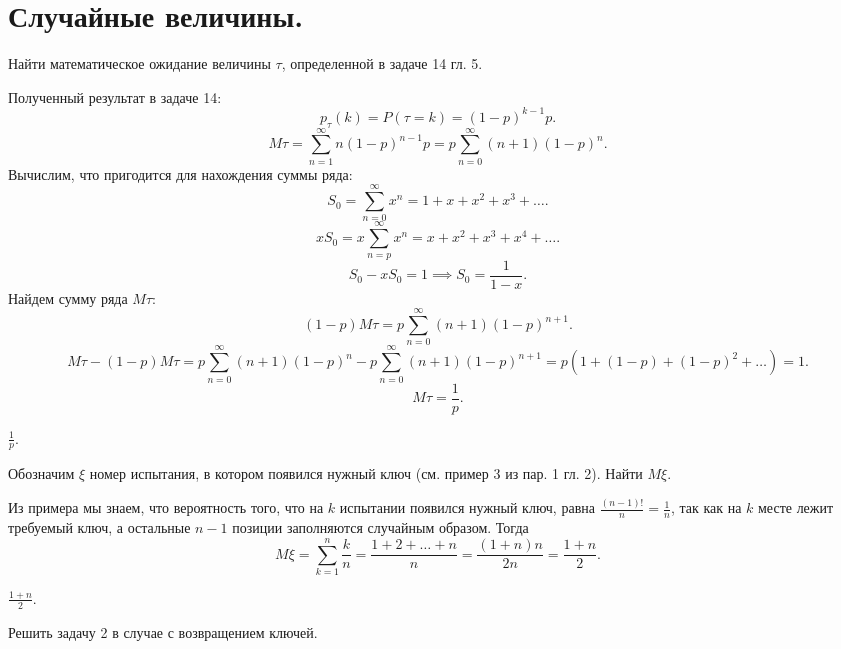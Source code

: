 
\section{Случайные величины.}

\begin{task}{1}
  Найти математическое ожидание величины $\tau$, определенной в задаче 14 гл. 5.
\end{task}

\begin{solution} Полученный результат в задаче 14:
\[
p_\tau(k) = P(\tau = k) = (1 - p)^{k - 1} p
.\] \[
M\tau = \sum_{n=1}^{\infty} n ( 1 - p)^{n - 1} p = p \sum_{n=0}^{\infty} (n + 1) (1 - p)^{n} 
.\] 
Вычислим, что пригодится для нахождения суммы ряда: \[
S_0 = \sum_{n=0}^{\infty} x^n = 1 + x + x^{2} + x^{3} + \dots
.\] 
\[
x S_0 = x \sum_{n=p}^{\infty} x^{n} = x + x^{2} + x^{3} + x^{4} + \dots
.\] 
\[
S_0 - xS_0 = 1 \implies S_0 = \frac{1}{1 - x}
.\] 
Найдем сумму ряда $M\tau$: \[
  (1 - p) M\tau = p \sum_{n=0}^{\infty} (n + 1)(1 - p)^{n + 1}
.\] 
\[
M\tau - (1 - p)M\tau = p \sum_{n=0}^{\infty} (n + 1) (1 - p)^{n} - p \sum_{n=0}^{\infty} (n + 1)(1 -
p)^{n + 1} = p \left(1 + (1 -p) + (1 - p)^{2} + \dots\right) = 1
.\] 
\[
M\tau = \frac{1}{p}
.\] 
\end{solution}

\begin{result}
$\frac{1}{p}$.
\end{result}
\medskip
\begin{task}{2}
  Обозначим $\xi$ номер испытания, в котором появился нужный ключ (см. пример 3 из пар. 1 гл. 2). Найти
  $M\xi$.
\end{task}

\begin{solution}
Из примера мы знаем, что вероятность того, что на $k$ испытании появился нужный ключ, равна
$\frac{(n- 1)!}{n} = \frac{1}{n}$, так как на $k$ месте лежит требуемый ключ, а остальные $n - 1$
позиции заполняются случайным образом. Тогда \[
M\xi = \sum_{k = 1}^{n} \frac{k}{n} = \frac{1 + 2 + \dots + n}{n} = \frac{\left(1 + n\right) n}{2n}
= \frac{1 + n}{2}
.\] 
\end{solution}

\begin{result}
$\frac{1 + n}{2}$.
\end{result}

\medskip
\begin{task}{3}
  Решить задачу 2 в случае с возвращением ключей.
\end{task}

